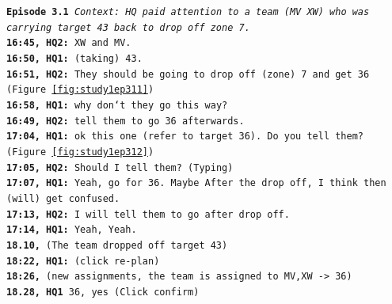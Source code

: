 \noindent\texttt{\textbf{Episode 3.1}
\emph{Context: HQ paid attention to a team (MV XW) who was carrying target 43 back to drop off zone 7.}\\
\textbf{16:45, HQ2:} XW and MV.\\
\textbf{16:50, HQ1:} (taking) 43. \\
\textbf{16:51, HQ2:} They should be going to drop off (zone) 7 and get 36 (Figure \ref{fig:study1ep311}) \\
\textbf{16:58, HQ1:} why don`t they go this way?\\
\textbf{16:49, HQ2:} tell them to go 36 afterwards.\\
\textbf{17:04, HQ1:} ok this one (refer to target 36). Do you tell them? (Figure \ref{fig:study1ep312})\\
\textbf{17:05, HQ2:} Should I tell them? (Typing)\\
\textbf{17:07, HQ1:} Yeah, go for 36. Maybe After the drop off, I think then (will) get confused.\\
\textbf{17:13, HQ2:} I will tell them to go after drop off.\\
\textbf{17:14, HQ1:} Yeah, Yeah. \\
\textbf{18.10,} (The team dropped off target 43)\\
\textbf{18:22, HQ1:} (click re-plan) \\
\textbf{18:26,} (new assignments, the team is assigned to MV,XW -> 36)\\
\textbf{18.28, HQ1} 36, yes (Click confirm)\\
}


